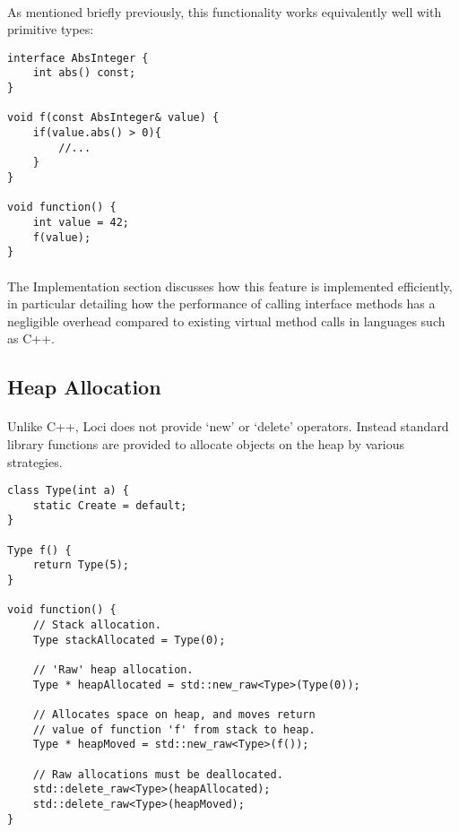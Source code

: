 \documentclass[12pt,twoside,notitlepage]{report}
\begin{document}
\paragraph{}
As mentioned briefly previously, this functionality works equivalently well with primitive types:

\begin{lstlisting}
interface AbsInteger {
	int abs() const;
}

void f(const AbsInteger& value) {
	if(value.abs() > 0){
		//...
	}
}

void function() {
	int value = 42;
	f(value);
}
\end{lstlisting}

\paragraph{}
The Implementation section discusses how this feature is implemented efficiently, in particular detailing how the performance of calling interface methods has a negligible overhead compared to existing virtual method calls in languages such as C++.

\clearpage

\subsection{Heap Allocation}

\paragraph{}
Unlike C++, Loci does not provide `new' or `delete' operators. Instead standard library functions are provided to allocate objects on the heap by various strategies.


\begin{lstlisting}
class Type(int a) {
	static Create = default;
}

Type f() {
	return Type(5);
}

void function() {
	// Stack allocation.
	Type stackAllocated = Type(0);
	
	// 'Raw' heap allocation.
	Type * heapAllocated = std::new_raw<Type>(Type(0));
	
	// Allocates space on heap, and moves return
	// value of function 'f' from stack to heap.
	Type * heapMoved = std::new_raw<Type>(f());
	
	// Raw allocations must be deallocated.
	std::delete_raw<Type>(heapAllocated);
	std::delete_raw<Type>(heapMoved);
}
\end{lstlisting}
\end{document}
